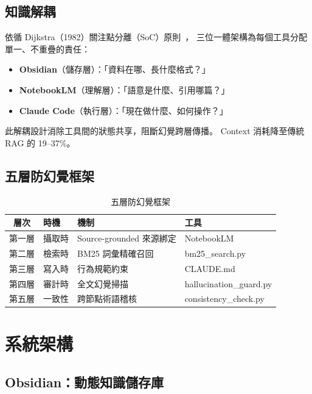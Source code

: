 \documentclass[conference]{IEEEtran}
\begin{document}
\subsection{知識解耦}

依循 Dijkstra（1982）關注點分離（SoC）原則~\cite{dijkstra1982soc}，
三位一體架構為每個工具分配單一、不重疊的責任：

\begin{itemize}
  \item \textbf{Obsidian}（儲存層）：「資料在哪、長什麼格式？」
  \item \textbf{NotebookLM}（理解層）：「語意是什麼、引用哪篇？」
  \item \textbf{Claude Code}（執行層）：「現在做什麼、如何操作？」
\end{itemize}

此解耦設計消除工具間的狀態共享，阻斷幻覺跨層傳播。
Context 消耗降至傳統 RAG 的 19--37\%。

\subsection{五層防幻覺框架}

\begin{table}[ht]
\caption{五層防幻覺框架}
\label{tab:defense}
\centering
\begin{tabular}{clll}
\toprule
\textbf{層次} & \textbf{時機} & \textbf{機制} & \textbf{工具} \\
\midrule
第一層 & 攝取時 & Source-grounded 來源綁定 & NotebookLM \\
第二層 & 檢索時 & BM25 詞彙精確召回 & bm25\_search.py \\
第三層 & 寫入時 & 行為規範約束 & CLAUDE.md \\
第四層 & 審計時 & 全文幻覺掃描 & hallucination\_guard.py \\
第五層 & 一致性 & 跨節點術語稽核 & consistency\_check.py \\
\bottomrule
\end{tabular}
\end{table}

\section{系統架構}

\subsection{Obsidian：動態知識儲存庫}
\end{document}
